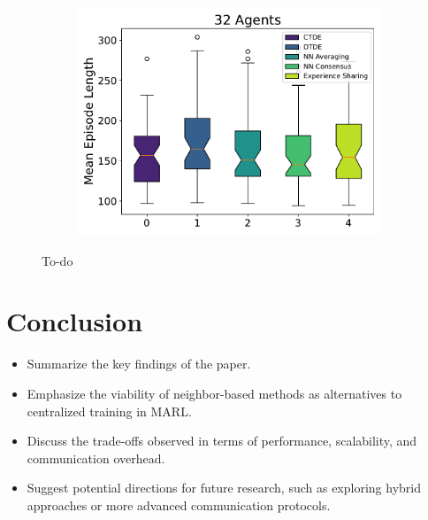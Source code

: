\documentclass[sigconf]{acmart}
\begin{document}
\begin{figure}[htb]
\begin{subfigure}[b]{0.3\textwidth}
      \centering
      \includegraphics[width=\textwidth]{figures/mean-time-comparison-32-agents.pdf}
  \end{subfigure}
  \caption{ To-do
  }
  \label{fig:time-eval}
\end{figure}


\section{Conclusion}\label{sec:conclusion}
\begin{itemize}
\item Summarize the key findings of the paper.
\item Emphasize the viability of neighbor-based methods as alternatives to centralized training in MARL.
\item Discuss the trade-offs observed in terms of performance, scalability, and communication overhead.
\item Suggest potential directions for future research, such as exploring hybrid approaches or more advanced communication protocols.
\end{itemize}



 
\end{document}

